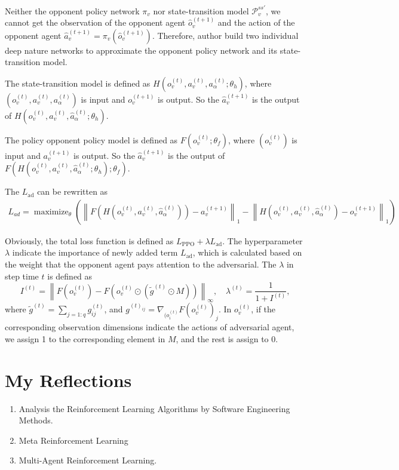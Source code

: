 \documentclass[a4paper]{article}
\begin{document}
Neither the opponent policy network $\pi_v$ nor state-transition model $\mathcal{P}_v^{ss'}$,
we cannot get the observation of the opponent agent $\hat{o}_v^{(t+1)}$ and the action of the opponent agent $\hat{a}_v^{(t+1)} = \pi_v(\hat{o}_v^{(t+1)})$.
Therefore, author build two individual deep nature networks to approximate the opponent policy network and its state-transition model.

The state-transition model is defined as $H(o_v^{(t)},a_v^{(t)},a_\alpha^{(t)}; \theta_h)$, where $(o_v^{(t)},a_v^{(t)},a_\alpha^{(t)})$ is input and $o_v^{(t+1)}$ is output.
So the $\hat{a}_{v}^{(t+1)}$ is the output of $H(o_v^{(t)},a_v^{(t)},\hat{a}_\alpha^{(t)}; \theta_h)$.

The policy opponent policy model is defined as $F(o_v^{(t)}; \theta_f)$, where $(o_v^{(t)})$ is input and $a_v^{(t+1)}$ is output.
So the $\hat{a}_{v}^{(t+1)}$ is the output of $F(H(o_v^{(t)},a_v^{(t)},\hat{a}_\alpha^{(t)}; \theta_h);\theta_f)$. 

The $L_\text{ad}$ can be rewritten as
\begin{equation}
    \begin{aligned}
        L_{a d}= \operatorname{maximize}_{\theta}\left(\left\|F\left(H\left(o_{v}^{(t)}, a_{v}^{(t)}, \hat{a}_{\alpha}^{(t)}\right)\right)-a_{v}^{(t+1)}\right\|_{1}-\left\|H\left(o_{v}^{(t)}, a_{v}^{(t)}, \hat{a}_{\alpha}^{(t)}\right)-o_{v}^{(t+1)}\right\|_{1}\right)
    \end{aligned}    
\end{equation}

Obviously, the total loss function is defined as $L_\text{PPO} + \lambda L_\text{ad}$. The hyperparameter $\lambda$ indicate the importance of newly added term $L_\text{ad}$, 
which is calculated based on the weight that the opponent agent pays attention to the adversarial. 
The $\lambda$ in step time $t$ is defined as
\begin{equation}
    I^{(t)}=\left\|F\left(o_{v}^{(t)}\right)-F\left(o_{v}^{(t)} \odot\left(\tilde{g}^{(t)} \odot M\right)\right)\right\|_{\infty},\quad \lambda^{(t)}=\frac{1}{1+I^{(t)}},
\end{equation}
where $\tilde{g}^{(t)} = \sum_{j=1:q} g_{ij}^{(t)}$, and $g^{(t)_{ij}} = \nabla_{(o^{(t)}_i} F(o^{(t)}_v)_j$. 
In $o^{(t)}_v$, if the corresponding observation dimensions indicate the actions of adversarial agent, we assign 1 to the
corresponding element in $M$, and the rest is assign to 0.


\section{My Reflections}
\begin{enumerate}
    \item Analysis the Reinforcement Learning Algorithms by Software Engineering Methods.
    \item Meta Reinforcement Learning
    \item Multi-Agent Reinforcement Learning.
\end{enumerate}
\end{document}

